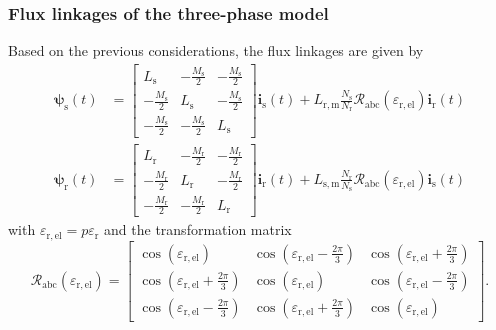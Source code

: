 \begin{frame}
	\frametitle{Flux linkages of the three-phase model}
    Based on the previous considerations, the flux linkages are given by
    \begin{equation}
        \renewcommand*{\arraystretch}{1.15}
        \begin{split}
            \bm{\psi}_\mathrm{s}(t) &=\begin{bmatrix}
                L_\mathrm{s} & -\frac{M_\mathrm{s}}{2} & -\frac{M_\mathrm{s}}{2}\\
                -\frac{M_\mathrm{s}}{2} & L_\mathrm{s} & -\frac{M_\mathrm{s}}{2}\\
                -\frac{M_\mathrm{s}}{2} & -\frac{M_\mathrm{s}}{2} & L_\mathrm{s}
            \end{bmatrix} \bm{i}_\mathrm{s}(t) +  L_{\mathrm{r,m}}\frac{N_\mathrm{s}}{N_\mathrm{r}} \bm{\mathcal{R}}_\mathrm{abc}(\varepsilon_\mathrm{r,el})\bm{i}_\mathrm{r}(t)\\
            \bm{\psi}_\mathrm{r}(t) &= \begin{bmatrix}
                L_\mathrm{r} & -\frac{M_\mathrm{r}}{2} & -\frac{M_\mathrm{r}}{2}\\
                -\frac{M_\mathrm{r}}{2} & L_\mathrm{r} & -\frac{M_\mathrm{r}}{2}\\
                -\frac{M_\mathrm{r}}{2} & -\frac{M_\mathrm{r}}{2} & L_\mathrm{r}
            \end{bmatrix} \bm{i}_\mathrm{r}(t) +  L_{\mathrm{s,m}}\frac{N_\mathrm{r}}{N_\mathrm{s}} \bm{\mathcal{R}}_\mathrm{abc}(\varepsilon_\mathrm{r,el})\bm{i}_\mathrm{s}(t) 
        \end{split}
        \label{eq:Flux_linkage_model_IM_abc}
    \end{equation}
    with $\varepsilon_\mathrm{r,el}=p\varepsilon_\mathrm{r}$ and the transformation matrix
    \begin{equation}
        \renewcommand*{\arraystretch}{1.15}
        \bm{\mathcal{R}}_\mathrm{abc}(\varepsilon_\mathrm{r,el}) =\begin{bmatrix}
           \cos(\varepsilon_\mathrm{r,el})  & \cos(\varepsilon_\mathrm{r,el} - \frac{2\pi}{3}) & \cos(\varepsilon_\mathrm{r,el} + \frac{2\pi}{3})\\
            \cos(\varepsilon_\mathrm{r,el} + \frac{2\pi}{3}) & \cos(\varepsilon_\mathrm{r,el}) & \cos(\varepsilon_\mathrm{r,el} - \frac{2\pi}{3})\\
            \cos(\varepsilon_\mathrm{r,el} - \frac{2\pi}{3}) & \cos(\varepsilon_\mathrm{r,el} + \frac{2\pi}{3}) & \cos(\varepsilon_\mathrm{r,el})
        \end{bmatrix}.
    \end{equation}
\end{frame}

